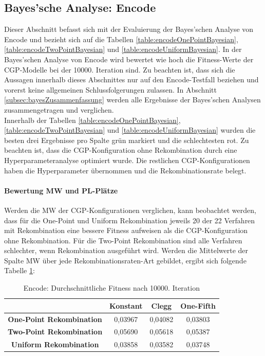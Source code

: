 \subsection{Bayes'sche Analyse: Encode}
\label{subsec:bayesEncode}

Dieser Abschnitt befasst sich mit der Evaluierung der Bayes'schen Analyse von Encode und bezieht sich auf die Tabellen \ref{table:encodeOnePointBayesian}, \ref{table:encodeTwoPointBayesian} und \ref{table:encodeUniformBayesian}.
In der Bayes'schen Analyse von Encode wird bewertet wie hoch die Fitness-Werte der CGP-Modelle bei der 10000. Iteration sind.
Zu beachten ist, dass sich die Aussagen innerhalb dieses Abschnittes nur auf den Encode-Testfall beziehen und vorerst keine allgemeinen Schlussfolgerungen zulassen.
In Abschnitt \ref{subsec:bayesZusammenfassung} werden alle Ergebnisse der Bayes'schen Analysen zusammengetragen und verglichen.\\
Innerhalb der Tabellen \ref{table:encodeOnePointBayesian}, \ref{table:encodeTwoPointBayesian} und \ref{table:encodeUniformBayesian} wurden die besten drei Ergebnisse pro Spalte grün markiert und die schlechtesten rot.
Zu beachten ist, dass die CGP-Konfiguration ohne Rekombination durch eine Hyperparameteranalyse optimiert wurde.
Die restlichen CGP-Konfigurationen haben die Hyperparameter übernommen und die Rekombinationsrate belegt.
\paragraph{Bewertung MW und PL-Plätze}
Werden die MW der CGP-Konfigurationen verglichen, kann beobachtet werden, dass für die One-Point und Uniform Rekombination jeweils 20 der 22 Verfahren mit Rekombination eine bessere Fitness aufweisen als die CGP-Konfiguration ohne Rekombination.
Für die Two-Point Rekombination sind alle Verfahren schlechter, wenn Rekombination ausgeführt wird.
Werden die Mittelwerte der Spalte MW über jede Rekombinationsraten-Art gebildet, ergibt sich folgende Tabelle \ref{table:encodeMW}:

\begin{table}[H]
	\centering
	\begin{tabular} {c | c | c | c}
		& \textbf{Konstant} & \textbf{Clegg} & \textbf{One-Fifth} \\
		\hline
		\textbf{One-Point Rekombination} & 0,03967 & 0,04082 & 0,03803\\
		\hline
		\textbf{Two-Point Rekombination} & 0,05690 & 0,05618 & 0,05387\\
		\hline
		\textbf{Uniform Rekombination} & 0,03858 & 0,03582 & 0,03748\\
	\end{tabular}
	\caption{Encode: Durchschnittliche Fitness nach 10000. Iteration}
	\label{table:encodeMW}
\end{table}

